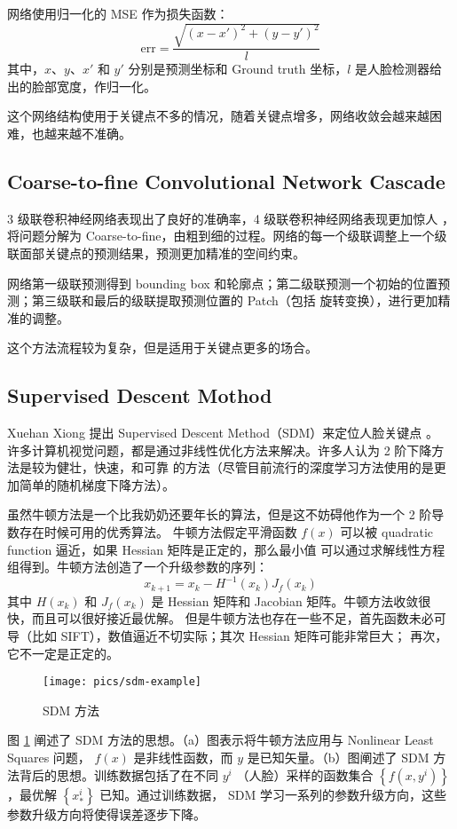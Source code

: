 \documentclass{ctexart}
\begin{document}
网络使用归一化的 MSE 作为损失函数：
$$
\mathrm{err} = \frac { \sqrt{ (x - x')^2 + (y - y')^2 } } {l}
$$
其中，$x$、$y$、$x'$ 和 $y'$ 分别是预测坐标和 Ground truth 坐标，$l$ 是人脸检测器给出的脸部宽度，作归一化。

这个网络结构使用于关键点不多的情况，随着关键点增多，网络收敛会越来越困难，也越来越不准确。

\subsection{Coarse-to-fine Convolutional Network Cascade}

3 级联卷积神经网络表现出了良好的准确率，4 级联卷积神经网络表现更加惊人 \cite{cascaded4_cnn}，将问题分解为 Coarse-to-fine，由粗到细的过程。网络的每一个级联调整上一个级联面部关键点的预测结果，预测更加精准的空间约束。

网络第一级联预测得到 bounding box 和轮廓点；第二级联预测一个初始的位置预测；第三级联和最后的级联提取预测位置的 Patch（包括
旋转变换），进行更加精准的调整。

这个方法流程较为复杂，但是适用于关键点更多的场合。

\subsection{Supervised Descent Mothod}

Xuehan Xiong 提出 Supervised Descent Method（SDM）来定位人脸关键点 \cite{sdm}。
许多计算机视觉问题，都是通过非线性优化方法来解决。许多人认为 2 阶下降方法是较为健壮，快速，和可靠
的方法（尽管目前流行的深度学习方法使用的是更加简单的随机梯度下降方法）。

虽然牛顿方法是一个比我奶奶还要年长的算法，但是这不妨碍他作为一个 2 阶导数存在时候可用的优秀算法。
牛顿方法假定平滑函数 $f(x)$ 可以被 quadratic function 逼近，如果 Hessian 矩阵是正定的，那么最小值
可以通过求解线性方程组得到。牛顿方法创造了一个升级参数的序列：
$$
x_{k+1} = x_k - H^{-1}(x_k) J_f(x_k)
$$
其中 $ H(x_k)$ 和 $J_f(x_k)$ 是 Hessian 矩阵和 Jacobian 矩阵。牛顿方法收敛很快，而且可以很好接近最优解。
但是牛顿方法也存在一些不足，首先函数未必可导（比如 SIFT），数值逼近不切实际；其次 Hessian 矩阵可能非常巨大；
再次，它不一定是正定的。

\begin{figure}
\centering
\texttt{[image: pics/sdm-example]}
\caption{SDM 方法}
\label{fig:sdm-example}
\end{figure}

图 \ref{fig:sdm-example} 阐述了 SDM 方法的思想。（a）图表示将牛顿方法应用与 Nonlinear Least Squares 问题，
$f(x)$ 是非线性函数，而 $y$ 是已知矢量。（b）图阐述了 SDM 方法背后的思想。训练数据包括了在不同 $y^i$
（人脸）采样的函数集合 $\left\{ f(x, y^i) \right\}$，最优解 $\left\{ x^i_* \right\}$ 已知。通过训练数据，
SDM 学习一系列的参数升级方向，这些参数升级方向将使得误差逐步下降。
\end{document}
